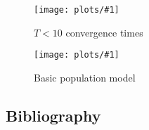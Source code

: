 \documentclass{article}
\newcommand{\plot}[3]{
    \begin{figure}[h]
        \texttt{[image: plots/\#1]}
        \caption{#2}
        \label{fig:#1}
    \end{figure}
}
\begin{document}
\plot{distance_convergence_times_low_T}{$T < 10$ convergence times}{0.6}

\plot{agent_based_population_model}{Basic population model}{0.6}



\subsection{Bibliography}
  

\footnotesize


\end{document}
